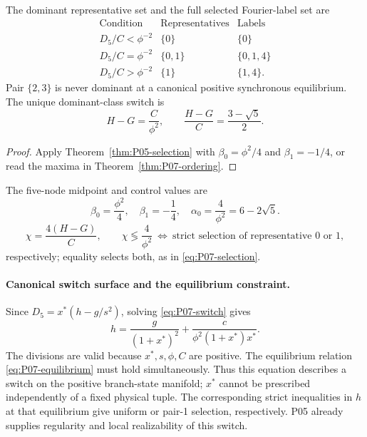 \begin{corollary}
\label{cor:P07-selection}
The dominant representative set and the full selected Fourier-label set are
\begin{equation}
\begin{array}{c|c|c}
\text{Condition}&\text{Representatives}&\text{Labels}\\\hline
D_5/C<\phi^{-2}&\{0\}&\{0\}\\
D_5/C=\phi^{-2}&\{0,1\}&\{0,1,4\}\\
D_5/C>\phi^{-2}&\{1\}&\{1,4\}.
\end{array}
\label{eq:P07-selection}
\end{equation}
Pair $\{2,3\}$ is never dominant at a canonical positive synchronous
 equilibrium. The unique dominant-class switch is
\begin{equation}
 \boxed{H-G=\frac{C}{\phi^2},\qquad
         \frac{H-G}{C}=\frac{3-\sqrt5}{2}.}
 \label{eq:P07-switch}
\end{equation}
\end{corollary}
\begin{proof}
Apply Theorem~\ref{thm:P05-selection} with
$\beta_0=\phi^2/4$ and $\beta_1=-1/4$, or read the maxima
in Theorem~\ref{thm:P07-ordering}.
\end{proof}


The five-node midpoint and control values are
\begin{equation}
 \beta_0=\frac{\phi^2}{4},\quad\beta_1=-\frac14,
 \quad\alpha_0=\frac4{\phi^2}=6-2\sqrt5.
 \label{eq:P07-midpoints}
\end{equation}
\begin{equation}
 \chi=\frac{4(H-G)}C,\qquad
 \chi\lessgtr\frac4{\phi^2}\ \Longleftrightarrow\
 \text{strict selection of representative }0\text{ or }1,
 \label{eq:P07-chi}
\end{equation}
respectively; equality selects both, as in \eqref{eq:P07-selection}.

\paragraph{Canonical switch surface and the equilibrium constraint.}
Since $D_5=x^*(h-g/s^2)$, solving \eqref{eq:P07-switch} gives
\begin{equation}
 \boxed{h=\frac{g}{(1+x^*)^2}
            +\frac{c}{\phi^2(1+x^*)x^*}.}
 \label{eq:P07-canonical-switch}
\end{equation}
The divisions are valid because $x^*,s,\phi,C$ are positive.
The equilibrium relation \eqref{eq:P07-equilibrium} must hold
simultaneously. Thus this equation describes a switch on the positive
branch-state manifold; $x^*$ cannot be prescribed independently of
a fixed physical tuple. The corresponding strict inequalities in $h$
at that equilibrium give uniform or pair-1 selection, respectively.
P05 already supplies regularity and local realizability of this switch.

